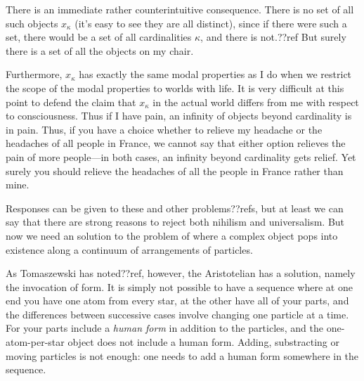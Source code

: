There is an immediate rather counterintuitive consequence. There is no set of all such objects
$x_\kappa$ (it's easy to see they are all distinct), since if there were such a set, there 
would be a set of all cardinalities $\kappa$, and there is not.??ref But surely 
there is a set of all the objects on my chair.

Furthermore, $x_\kappa$ has exactly the same modal properties as I do when we 
restrict the scope of the modal properties to worlds with life. It is very difficult at this point
to defend the claim that $x_\kappa$ in the actual world differs from me with respect to consciousness. 
Thus if I have pain, an infinity of objects beyond cardinality is in pain. Thus, if you have a choice
whether to relieve my headache or the headaches of all people in France, we cannot say that either option
relieves the pain of more people---in both cases, an infinity beyond cardinality gets relief. Yet
surely you should relieve the headaches of all the people in France rather than mine.

Responses can be given to these and other problems??refs, but at least we can say that there are
strong reasons to reject both nihilism and universalism. But now we need an solution to the
problem of where a complex object pops into existence along a continuum of arrangements of
particles. 

As Tomaszewski has noted??ref, however, the Aristotelian has a solution, namely
the invocation of form. It is simply not possible to have a sequence where at
one end you have one atom from every star, at the other have all of your parts,
and the differences between successive cases involve changing one particle at a time.
For your parts include a \textit{human form} in addition to the particles, and the
one-atom-per-star object does not include a human form.  Adding,
substracting or moving particles is not enough: one needs to add a human form
somewhere in the sequence.

